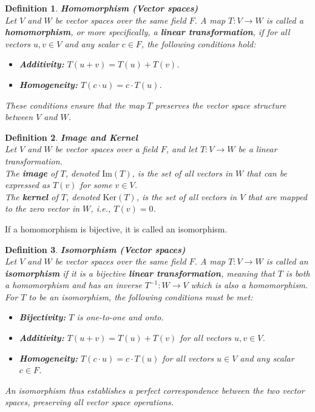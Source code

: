 \documentclass[11pt]{book} %
\newtheorem{definition}{Definition}[section]
\begin{document}
\begin{definition}{\textbf{Homomorphism (Vector spaces)}} \\
    Let \(V\) and \(W\) be vector spaces over the same field \(F\). A map \( T: V \to W \) is called a \textbf{homomorphism}, 
    or more specifically, a \textbf{linear transformation}, if for all vectors \(u, v \in V\) and any scalar \(c \in F\), the following conditions hold:
    \begin{itemize}
        \item \textbf{Additivity:} \( T(u + v) = T(u) + T(v) \).
        \item \textbf{Homogeneity:} \( T(c \cdot u) = c \cdot T(u) \).
    \end{itemize}
    These conditions ensure that the map \(T\) preserves the vector space structure between \(V\) and \(W\).
\end{definition}

\begin{definition}{\textbf{Image and Kernel}} \\
    Let \( V \) and \( W \) be vector spaces over a field \( F \), and let \( T: V \to W \) be a linear transformation.  \\
    The \textbf{image} of \( T \), denoted \( \text{Im}(T) \), is the set of all vectors in \( W \) that can be expressed as \( T(v) \) for some \( v \in V \). \\
    The \textbf{kernel} of \( T \), denoted \( \text{Ker}(T) \), is the set of all vectors in \( V \) that are mapped to the zero vector in \( W \), i.e., \( T(v) = 0 \).
\end{definition}


If a homomorphism is bijective, it is called an isomorphism.

\begin{definition}{\textbf{Isomorphism (Vector spaces)}} \\
    Let \( V \) and \( W \) be vector spaces over the same field \( F \). 
    A map \( T: V \to W \) is called an \textbf{isomorphism} if it is a bijective \textbf{linear transformation}, 
    meaning that \( T \) is both a homomorphism and has an inverse \( T^{-1}: W \to V \) which is also a homomorphism. 
    For \( T \) to be an isomorphism, the following conditions must be met:
    \begin{itemize}
        \item \textbf{Bijectivity:} \( T \) is one-to-one and onto.
        \item \textbf{Additivity:} \( T(u + v) = T(u) + T(v) \) for all vectors \( u, v \in V \).
        \item \textbf{Homogeneity:} \( T(c \cdot u) = c \cdot T(u) \) for all vectors \( u \in V \) and any scalar \( c \in F \).
    \end{itemize}
    An isomorphism thus establishes a perfect correspondence between the two vector spaces, preserving all vector space operations.
\end{definition}
\end{document}
